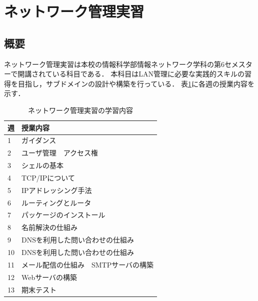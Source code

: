 \documentclass[12pt,a4j,titlepage]{ltjsarticle}
\begin{document}


\clearpage

\section{ネットワーク管理実習}
\subsection{概要}
ネットワーク管理実習は本校の情報科学部情報ネットワーク学科の第6セメスターで開講されている科目である．
本科目はLAN管理に必要な実践的スキルの習得を目指し，サブドメインの設計や構築を行っている．
表\ref{tb:kougi}に各週の授業内容を示す．

\begin{table}[htbp]
  \caption{ネットワーク管理実習の学習内容}
  \begin{center}
\begin{tabular}{ll}\hline
               週 & 授業内容 \\ \hline
               1 & ガイダンス\\
               2 & ユーザ管理　アクセス権\\
               3 & シェルの基本\\
               4 & TCP/IPについて\\
               5 & IPアドレッシング手法\\
               6 & ルーティングとルータ\\
               7 & パッケージのインストール\\
               8 & 名前解決の仕組み\\
               9 & DNSを利用した問い合わせの仕組み\\
              10 & DNSを利用した問い合わせの仕組み\\
              11 & メール配信の仕組み　SMTPサーバの構築\\
              12 & Webサーバの構築\\
              13 & 期末テスト\\
              \hline
               \end{tabular}
               \end{center}
               \label{tb:kougi}
               \end{table}
\end{document}
